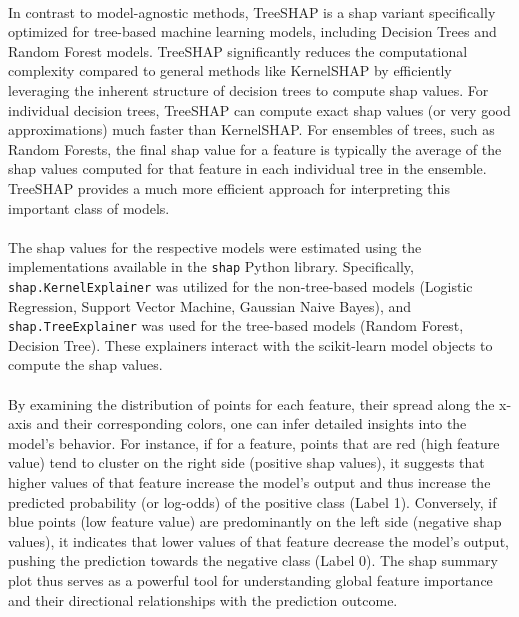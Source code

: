 \documentclass[12pt,a4paper]{report}
\begin{document}
\\
In contrast to model-agnostic methods, TreeSHAP \cite{Lundberg2019TreeSHAP} is a \gls{shap} variant specifically optimized for tree-based machine learning models, including Decision Trees and Random Forest models. TreeSHAP significantly reduces the computational complexity compared to general methods like KernelSHAP by efficiently leveraging the inherent structure of decision trees to compute \gls{shap} values. For individual decision trees, TreeSHAP can compute exact \gls{shap} values (or very good approximations) much faster than KernelSHAP. For ensembles of trees, such as Random Forests, the final \gls{shap} value for a feature is typically the average of the \gls{shap} values computed for that feature in each individual tree in the ensemble. TreeSHAP provides a much more efficient approach for interpreting this important class of models.\\
\\
The \gls{shap} values for the respective models were estimated using the implementations available in the \texttt{shap} Python library. Specifically, \texttt{shap.KernelExplainer} was utilized for the non-tree-based models (Logistic Regression, Support Vector Machine, Gaussian Naive Bayes), and \texttt{shap.TreeExplainer} was used for the tree-based models (Random Forest, Decision Tree). These explainers interact with the scikit-learn model objects to compute the \gls{shap} values.\\
\\
By examining the distribution of points for each feature, their spread along the x-axis and their corresponding colors, one can infer detailed insights into the model's behavior. For instance, if for a feature, points that are red (high feature value) tend to cluster on the right side (positive \gls{shap} values), it suggests that higher values of that feature increase the model's output and thus increase the predicted probability (or log-odds) of the positive class (Label 1). Conversely, if blue points (low feature value) are predominantly on the left side (negative \gls{shap} values), it indicates that lower values of that feature decrease the model's output, pushing the prediction towards the negative class (Label 0). The \gls{shap} summary plot thus serves as a powerful tool for understanding global feature importance and their directional relationships with the prediction outcome.
\end{document}
